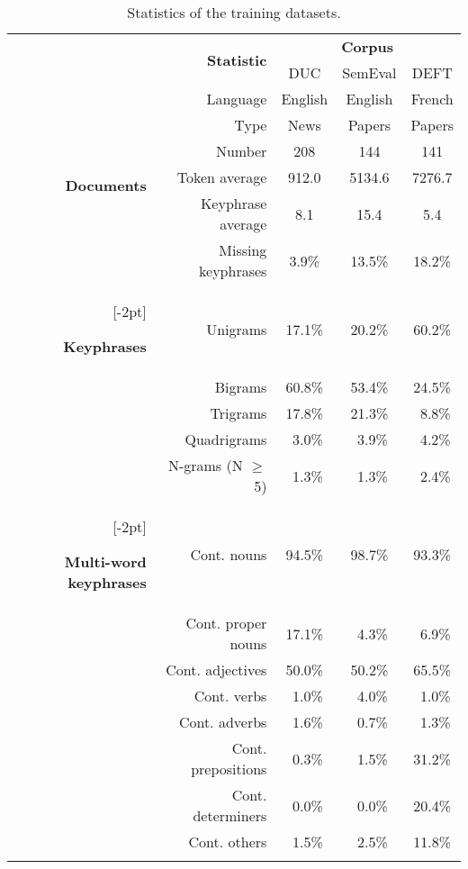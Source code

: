     \begin{table}[h]
      \centering
      \begin{tabular}{@{~}r@{~}r@{~}c@{~}c@{~}c@{~}}
        \toprule
        & \multirow{2}{*}[-2pt]{\textbf{Statistic}} & \multicolumn{3}{c}{\textbf{Corpus}}\\
        \cmidrule{3-5}
        & & DUC & SemEval & DEFT\\
        \midrule
        \multirow{6}{*}[-2pt]{\begin{sideways}\textbf{Documents}\end{sideways}} & Language & English & English & French\\
        & Type & News & Papers & Papers\\
        & Number & 208 & 144 & 141\\
        & Token average & 912.0 & 5134.6 & 7276.7\\
        & Keyphrase average & 8.1 & 15.4 & 5.4\\
        & Missing keyphrases & 3.9\% & 13.5\% & 18.2\%\\
        \addlinespace[1.5\defaultaddspace]
        \multirow{5}{*}[-2pt]{\begin{sideways}\textbf{Keyphrases}\end{sideways}} & Unigrams & 17.1\% & 20.2\% & 60.2\%\\
        & Bigrams & 60.8\% & 53.4\% & 24.5\%\\
        & Trigrams & 17.8\% & 21.3\% & $~~$8.8\%\\
        & Quadrigrams & $~~$3.0\% & $~~$3.9\% & $~~$4.2\%\\
        & N-grams (N $\geq$ 5) & $~~$1.3\% & $~~$1.3\% & $~~$2.4\%\\
        \addlinespace[1.5\defaultaddspace]
        \multirow{5}{*}[-2pt]{\begin{sideways}\textbf{Multi-word keyphrases}\end{sideways}} & Cont. nouns & 94.5\% & 98.7\% & 93.3\%\\
        & Cont. proper nouns & 17.1\% & $~~$4.3\% & $~~$6.9\%\\
        & Cont. adjectives & 50.0\% & 50.2\% & 65.5\%\\
        & Cont. verbs & $~~$1.0\% & $~~$4.0\% & $~~$1.0\%\\
        & Cont. adverbs & $~~$1.6\% & $~~$0.7\% & $~~$1.3\%\\
        & Cont. prepositions & $~~$0.3\% & $~~$1.5\% & 31.2\%\\
        & Cont. determiners & $~~$0.0\% & $~~$0.0\% & 20.4\%\\
        & Cont. others & $~~$1.5\% & $~~$2.5\% & 11.8\%\\
        \addlinespace[.5\defaultaddspace]
        \bottomrule
      \end{tabular}
      \caption{Statistics of the training datasets.
               \label{tab:train_dataset_statistics}}
    \end{table}

